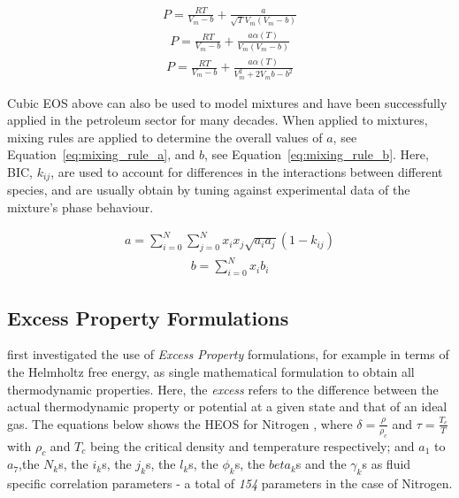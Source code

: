         \begin{align}
            P = \frac{R T}{V_m - b} + \frac{a}{\sqrt{T}V_m(V_m-b)}  \label{eq:RK_EOS}
        \end{align}
        \begin{align}
            P = \frac{R T}{V_m - b} + \frac{a\alpha (T)}{V_m(V_m-b)}  \label{eq:SRK_EOS}
        \end{align}
        \begin{align}
            P = \frac{R T}{V_m - b} + \frac{a\alpha (T)}{V_m^2 + 2V_mb-b^2}  \label{eq:PR_EOS}
        \end{align}

        Cubic \ac{EOS} above can also be used to model mixtures and have been successfully applied in the petroleum sector for many decades. When applied to mixtures, mixing rules are applied to determine the overall values of \(a\), see Equation~\ref{eq:mixing_rule_a}, and \(b\), see Equation~\ref{eq:mixing_rule_b}. Here, \ac{BIC}, \(k_{ij}\), are used to account for differences in the interactions between different species, and are usually obtain by tuning against experimental data of the mixture's phase behaviour.   

        \begin{align}
            a = \sum_{i=0}^N \sum_{j=0}^N x_i x_j \sqrt{a_i a_j} (1-k_{ij})  \label{eq:mixing_rule_a}
        \end{align}
        \begin{align}
            b = \sum_{i=0}^N x_i b_i  \label{eq:mixing_rule_b}
        \end{align}

    \subsection{Excess Property Formulations}
    \label{sec:excess_properties}
        \citeauthor{Peneloux1989} \cite{Peneloux1989} first investigated the use of \emph{Excess Property} formulations, for example in terms of the Helmholtz free energy, as single mathematical formulation to obtain all thermodynamic properties. Here, the \emph{excess} refers to the difference between the actual thermodynamic property or potential at a given state and that of an ideal gas. The equations below shows the \ac{HEOS} for Nitrogen \cite{Span2000}, where \(\delta=\frac{\rho}{\rho_c}\) and \(\tau =\frac{T_c}{T}\) with \(\rho_c\) and \(T_c\) being the critical density and temperature respectively; and \(a_1\) to \(a_7\),the \(N_k\)s, the \(i_k\)s, the \(j_k\)s, the \(l_k\)s, the \(\phi_k\)s, the \(beta_k\)s and the \(\gamma_k\)s as fluid specific correlation parameters - a total of \emph{\num{154}} parameters in the case of Nitrogen.

